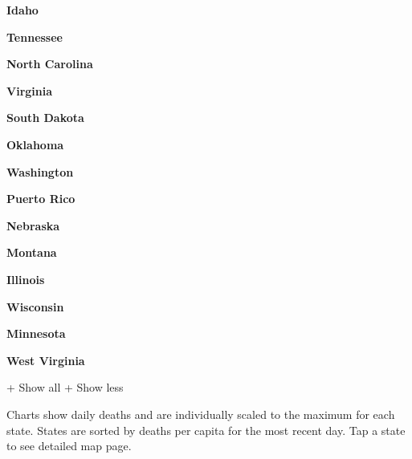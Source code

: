 \textbf{Idaho}

\href{https://www.nytimes.com/interactive/2020/us/tennessee-coronavirus-cases.html}{}

\textbf{Tennessee}

\href{https://www.nytimes.com/interactive/2020/us/north-carolina-coronavirus-cases.html}{}

\textbf{North Carolina}

\href{https://www.nytimes.com/interactive/2020/us/virginia-coronavirus-cases.html}{}

\textbf{Virginia}

\href{https://www.nytimes.com/interactive/2020/us/south-dakota-coronavirus-cases.html}{}

\textbf{South Dakota}

\href{https://www.nytimes.com/interactive/2020/us/oklahoma-coronavirus-cases.html}{}

\textbf{Oklahoma}

\href{https://www.nytimes.com/interactive/2020/us/washington-coronavirus-cases.html}{}

\textbf{Washington}

\href{https://www.nytimes.com/interactive/2020/us/puerto-rico-coronavirus-cases.html}{}

\textbf{Puerto Rico}

\href{https://www.nytimes.com/interactive/2020/us/nebraska-coronavirus-cases.html}{}

\textbf{Nebraska}

\href{https://www.nytimes.com/interactive/2020/us/montana-coronavirus-cases.html}{}

\textbf{Montana}

\href{https://www.nytimes.com/interactive/2020/us/illinois-coronavirus-cases.html}{}

\textbf{Illinois}

\href{https://www.nytimes.com/interactive/2020/us/wisconsin-coronavirus-cases.html}{}

\textbf{Wisconsin}

\href{https://www.nytimes.com/interactive/2020/us/minnesota-coronavirus-cases.html}{}

\textbf{Minnesota}

\href{https://www.nytimes.com/interactive/2020/us/west-virginia-coronavirus-cases.html}{}

\textbf{West Virginia}

+ Show all + Show less

Charts show daily deaths and are individually scaled to the maximum for
each state. States are sorted by deaths per capita for the most recent
day. Tap a state to see detailed map page.


